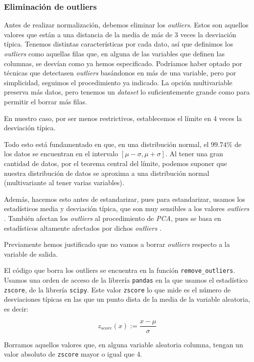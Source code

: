 \documentclass[11pt]{article}
\begin{document}
\subsubsection{Eliminación de outliers}

Antes de realizar normalización, debemos eliminar los \emph{outliers}. Estos son aquellos valores que están a una distancia de la media de más de 3 veces la desviación típica. Tenemos distintas características por cada dato, así que definimos los \emph{outliers} como aquellas filas que, en alguna de las variables que definen las columnas, se desvían como ya hemos especificado. Podríamos haber optado por técnicas que detectasen \emph{outliers} basándonos en más de una variable, pero por simplicidad, seguimos el procedimiento ya indicado. La opción multivariable preserva más datos, pero tenemos un \emph{dataset} lo suficientemente grande como para permitir el borrar más filas.

En nuestro caso, por ser menos restrictivos, establecemos el límite en 4 veces la desviación típica.

Todo esto está fundamentado en que, en una distribución normal, el $99.74\%$ de los datos se encuentran en el intervalo $[\mu - \sigma, \mu + \sigma]$. Al tener una gran cantidad de datos, por el teorema central del límite, podemos suponer que nuestra distribución de datos se aproxima a una distribución normal (multivariante al tener varias variables).

Además, hacemos esto antes de estandarizar, pues para estandarizar, usamos los estadísticos media y desviación típica, que son muy sensibles a los valores \emph{outliers} \cite{scikit_scale_with_outliers:online}. También afectan los \emph{outliers} al procedimiento de \emph{PCA}, pues se basa en estadísticos altamente afectados por dichos \emph{outliers} \cite{pca_medium:online}.

Previamente hemos justificado que no vamos a borrar \emph{outliers} respecto a la variable de salida.

El código que borra los outliers se encuentra en la función \lstinline{remove_outliers}. Usamos una orden de acceso de la librería \lstinline{pandas} en la que usamos el estadístico \lstinline{zscore}, de la librería \lstinline{scipy}. Este valor \lstinline{zscore} lo que mide es el número de desviaciones típicas en las que un punto dista de la media de la variable aleatoria, es decir:

$$z_{score}(x) := \frac{x - \mu}{\sigma}$$

Borramos aquellos valores que, en alguna variable aleatoria columna, tengan un valor absoluto de \lstinline{zscore} mayor o igual que 4.
\end{document}
